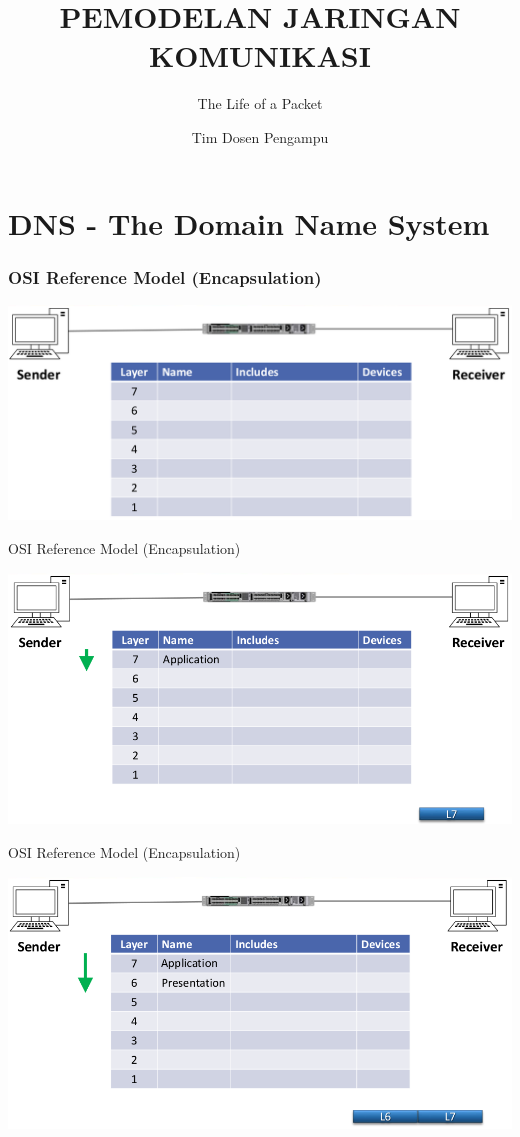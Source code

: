 \documentclass[pdflatex,compress,mathserif]{beamer}
\title{PEMODELAN JARINGAN KOMUNIKASI}
\subtitle{The Life of a Packet}
\author{Tim Dosen Pengampu}
\begin{document}
\maketitle

\section{DNS - The Domain Name System}

\begin{frame}
	\frametitle{OSI Reference Model (Encapsulation)}
	\begin{center}
		\includegraphics[width=\linewidth]{img/img01}
	\end{center}
\end{frame}

\begin{frame}{OSI Reference Model (Encapsulation)}
	\begin{center}
		\includegraphics[width=\linewidth]{img/img02}
	\end{center}
\end{frame}

\begin{frame}{OSI Reference Model (Encapsulation)}
	\begin{center}
		\includegraphics[width=\linewidth]{img/img03}
	\end{center}
\end{frame}
\end{document}
